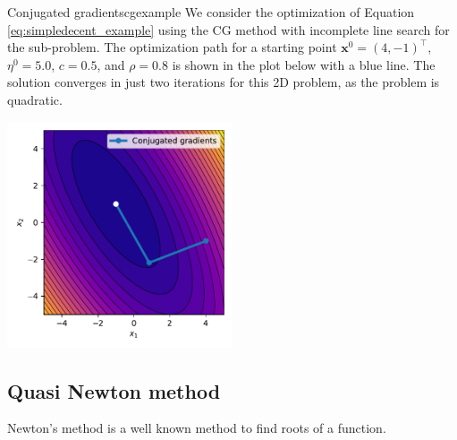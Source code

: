 \begin{example}{Conjugated gradients}{cgexample}
    We consider the optimization of Equation \eqref{eq:simpledecent_example} using the CG method with incomplete line search for the sub-problem. The optimization path for a starting point $\mathbf{x}^0= (4, -1)^\top$, $\eta^0=5.0$, $c=0.5$, and $\rho=0.8$ is shown in the plot below with a blue line. The solution converges in just two iterations for this 2D problem, as the problem is quadratic.
    \begin{center}
        \includegraphics[width=0.5\textwidth]{figures/cg.pdf}
    \end{center}   
\end{example}

\subsection{Quasi Newton method}
Newton's method is a well known method to find roots of a function. 

